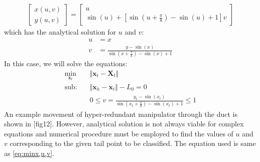 \documentclass[11pt,a4paper]{article}
\begin{document}
\begin{align}
\begin{bmatrix}
x(u,v)\\y(u,v)
\end{bmatrix} = 
\begin{bmatrix}
u\\\sin\left(u\right)+\left[\sin\left(u+\frac{\pi}{8}\right)-\sin\left(u\right)+1 \right]v
\end{bmatrix}
\end{align}
which has the analytical solution for $u$ and $v$:
\begin{align*}
u &= x\\
v &= \frac{y-\sin\left(x\right)}{\sin\left(x+\frac{\pi}{8}\right)-\sin\left(x\right)+1}
\end{align*}
In this case, we will solve the equations:
\begin{align}
\label{eq:analy2D}
\min_{\textbf{x}_t} &\Vert \textbf{x}_t-\textbf{X}_t \Vert\\
\nonumber \text{sub:~~~} &\Vert \textbf{x}_h - \textbf{x}_t \Vert -L_0 = 0\\
&0\leq v=\frac{y_t-\sin\left(x_t\right)}{\sin\left(x_t+\frac{\pi}{8}\right)-\sin\left(x_t\right)+1}\leq 1
\end{align} 
 An example movement of hyper-redundant manipulator through the duct is shown in [fig12]. However, analytical solution is not always viable for complex equations and numerical procedure must be employed to find the values of $u$ and $v$ corresponding to the given tail point to be classified. The equation used is same as \ref{eq:minx,u,v}.
\end{document}
